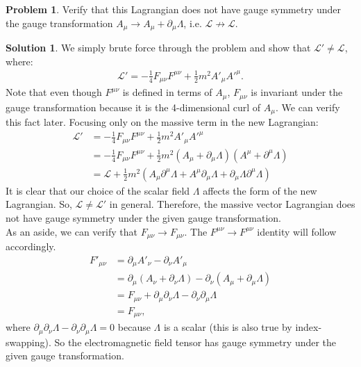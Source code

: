 \documentclass[a4paper,11pt]{article}
\numberwithin{equation}{section}
\theoremstyle{definition}
\newtheorem{prob}{Problem}[section]
\newtheorem{sln}{Solution}[section]
\newcommand{\p}{\partial}
\newcommand{\lag}{\mathcal{L}}
\begin{document}
\begin{prob}
	Verify that this Lagrangian does not have gauge symmetry under the gauge transformation $A_\mu \to A_\mu +\p_\mu \Lambda$, i.e. $\lag \not\to \lag$.\\
	\begin{sln}
		We simply brute force through the problem and show that $\lag' \neq \lag$, where:
		\begin{align}
		\lag' = -\frac{1}{4}F_{\mu\nu}F^{\mu\nu} + \frac{1}{2}m^2 A'_\mu A'^\mu.
		\end{align}
		Note that even though $F^{\mu\nu}$ is defined in terms of $A_\mu$, $F_{\mu\nu}$ is invariant under the gauge transformation because it is the 4-dimensional curl of $A_\mu$. We can verify this fact later. Focusing only on the massive term in the new Lagrangian:
		\begin{align}
		\lag' &= -\frac{1}{4}F_{\mu\nu}F^{\mu\nu} + \frac{1}{2}m^2 A'_\mu A'^\mu\\
		&= -\frac{1}{4}F_{\mu\nu}F^{\mu\nu} +\frac{1}{2}m^2(A_\mu + \p_\mu \Lambda)(A^\mu + \p^\mu \Lambda)\\
		&= \lag + \frac{1}{2}m^2(A_\mu \p^\mu\Lambda + A^\mu \p_\mu \Lambda + \p_\mu\Lambda \p^\mu \Lambda)
		\end{align}
		It is clear that our choice of the scalar field $\Lambda$ affects the form of the new Lagrangian. So, $\lag \neq \lag'$ in general. Therefore, the massive vector Lagrangian does not have gauge symmetry under the given gauge transformation.\\
		
		As an aside, we can verify that $F_{\mu\nu}\to F_{\mu\nu}$. The $F^{\mu\nu} \to F^{\mu\nu}$ identity will follow accordingly. 
		\begin{align}
		F'_{\mu\nu} &= \p_\mu A'_\nu - \p_\nu A'_\mu\\
		&= \p_\mu(A_\nu + \p_\nu\Lambda) - \p_\nu(A_\mu + \p_\mu\Lambda)\\
		&= F_{\mu\nu} + \p_\mu \p_\nu \Lambda - \p_\nu \p_\mu\Lambda\\
		&= F_{\mu\nu},
		\end{align}
		where $\p_\mu \p_\nu \Lambda - \p_\nu \p_\mu\Lambda=0$ because $\Lambda$ is a scalar (this is also true by index-swapping). So the electromagnetic field tensor has gauge symmetry under the given gauge transformation. \\
	\end{sln}
\end{prob}


\newpage
\end{document}
